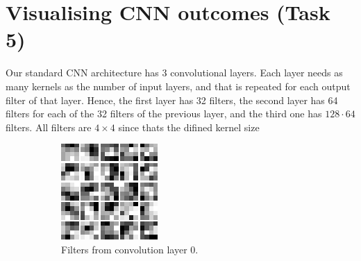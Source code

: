 \documentclass{article}
\begin{document}
\section{Visualising CNN outcomes (Task 5)}

Our standard CNN architecture has 3 convolutional layers. Each layer needs as many kernels as the number of input layers, and that is repeated for each output filter of that layer.
Hence, the first layer has 32 filters, the second layer has 64 filters for each of the 32 filters of the previous layer, and the third one has \(128 \cdot 64\) filters.
All filters are \(4\times4\) since thats the difined kernel size

\begin{figure}[h!]
    \centering
    \begin{subfigure}[t]{0.3\textwidth}
        \centering
        \includegraphics[width=\textwidth]{./plots/layer_0_plot.png}
        \caption{Filters from convolution layer 0.}
        \label{fig:subfig17a}
    \end{subfigure}
    \hfill
    \begin{subfigure}[t]{0.3\textwidth}
        \centering

\end{subfigure}
\end{figure}
\end{document}
